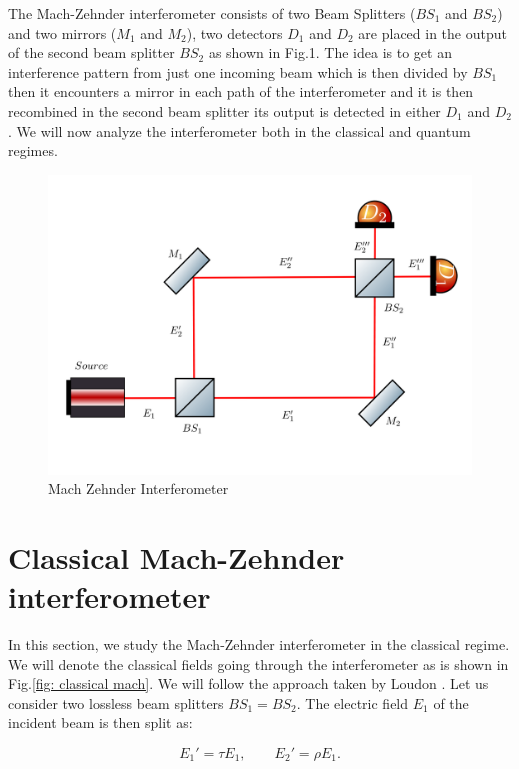 \documentclass{book}
\begin{document}
The Mach-Zehnder interferometer consists of two Beam Splitters ($BS_{1}$ and $BS_{2}$) and two mirrors ($M_{1}$ and $M_{2}$), two detectors $D_{1}$ and $D_{2}$ are placed in the output of the second beam splitter $BS_{2}$ as shown in Fig.1. The idea is to get an interference pattern from just one incoming beam which is then divided by $BS_{1}$ then it encounters a mirror in each path of the interferometer and it is then recombined in the second beam splitter its output is detected in either $D_{1}$ and $D_{2}$. We will now analyze the interferometer both in the classical and quantum regimes.

\pagebreak
\begin{figure}[h]
\centering
\includegraphics[width=\linewidth]{images/machzenhdercla.png}
\caption{Mach Zehnder Interferometer}
\label{fig:classical mach}
\end{figure}



\section{Classical Mach-Zehnder interferometer}

In this section, we study the Mach-Zehnder interferometer in the classical regime. We will denote the classical fields going through the interferometer as is shown in Fig.\ref{fig: classical mach}. We will follow the approach taken by Loudon \cite{ludon}. Let us consider two lossless beam splitters   $BS_{1}=BS_{2}$. The electric field $E_{1}$ of the incident beam is then split as:

\begin{equation}
E_{1}'=\tau E_{1} ,\qquad E_{2}'=\rho E_{1}.
\end{equation}
\end{document}
